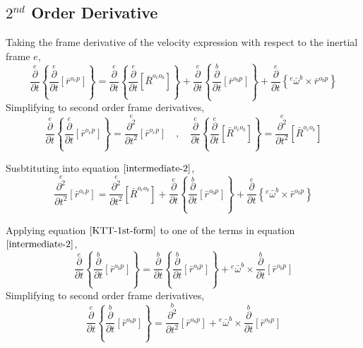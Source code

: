 \documentclass[class=report, 12pt, crop=false]{standalone}
\begin{document}
\begin{center}
\section{$2^{nd}$ Order Derivative}
\begin{comment}
\end{comment}
Taking the frame derivative of the velocity expression with respect to the inertial frame $e$,
\begin{equation}
\overset{e}{\frac{\partial}{\partial t}}\left\{\overset{e}{\frac{\partial}{\partial t}}[\bar{r}^{o_{e}p}]\right\}      =    \overset{e}{\frac{\partial}{\partial t}}\left\{\overset{e}{\frac{\partial}{\partial t}}[\bar{R}^{o_{e}o_{b}}]\right\}     +  \overset{e}{\frac{\partial}{\partial t}}\left\{\overset{b}{\frac{\partial}{\partial t}}[\bar{r}^{o_{b}p}]\right\}      +   \overset{e}{\frac{\partial}{\partial t}}\left\{{}^{e}\bar{\omega}^{b}\times\bar{r}^{o_{b}p}\right\}
\label{intermediate-2}
\end{equation}
Simplifying to second order frame derivatives,
$$\overset{e}{\frac{\partial}{\partial t}}\left\{\overset{e}{\frac{\partial}{\partial t}}[\bar{r}^{o_{e}p}]\right\} = \overset{e}{\frac{\partial^{2}}{\partial t^{2}}}[\bar{r}^{o_{e}p}]\quad,\quad \overset{e}{\frac{\partial}{\partial t}}\left\{\overset{e}{\frac{\partial}{\partial t}}[\bar{R}^{o_{e}o_{b}}]\right\} =  \overset{e}{\frac{\partial^{2}}{\partial t^{2}}}[\bar{R}^{o_{e}o_{b}}]$$

Susbtituting into equation $\ref{intermediate-2}$,
\begin{equation}\overset{e}{\frac{\partial^{2}}{\partial t^{2}}}[\bar{r}^{o_{e}p}]    =    \overset{e}{\frac{\partial^{2}}{\partial t^{2}}}[\bar{R}^{o_{e}o_{b}}]     +  \overset{e}{\frac{\partial}{\partial t}}\left\{\overset{b}{\frac{\partial}{\partial t}}[\bar{r}^{o_{b}p}]\right\}      +   \overset{e}{\frac{\partial}{\partial t}}\left\{{}^{e}\bar{\omega}^{b}\times\bar{r}^{o_{b}p}\right\}\label{inter-4}\end{equation}

Applying equation $\ref{KTT-1st-form}$ to one of the terms in equation $\ref{intermediate-2}$,
$$\overset{e}{\frac{\partial}{\partial t}}\left\{\overset{b}{\frac{\partial}{\partial t}}[\bar{r}^{o_{b}p}]\right\} = \overset{b}{\frac{\partial}{\partial t}}\left\{\overset{b}{\frac{\partial}{\partial t}}[\bar{r}^{o_{b}p}]\right\} + {}^{e}\bar{\omega}^{b}\times\overset{b}{\frac{\partial}{\partial t}}[\bar{r}^{o_{b}p}]$$
Simplifying to second order frame derivatives,
\begin{equation}\overset{e}{\frac{\partial}{\partial t}}\left\{\overset{b}{\frac{\partial}{\partial t}}[\bar{r}^{o_{b}p}]\right\} = \overset{b}{\frac{\partial^{2}}{\partial t^{2}}}[\bar{r}^{o_{b}p}] + {}^{e}\bar{\omega}^{b}\times\overset{b}{\frac{\partial}{\partial t}}[\bar{r}^{o_{b}p}]\label{whammu-1}\end{equation}


\end{center}
\end{document}
